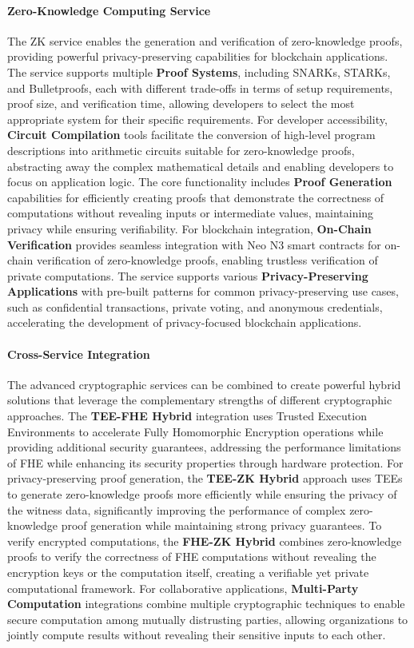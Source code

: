 \documentclass[11pt]{article}
\begin{document}
\paragraph{Zero-Knowledge Computing Service}
The ZK service enables the generation and verification of zero-knowledge proofs, providing powerful privacy-preserving capabilities for blockchain applications. The service supports multiple \textbf{Proof Systems}, including SNARKs, STARKs, and Bulletproofs, each with different trade-offs in terms of setup requirements, proof size, and verification time, allowing developers to select the most appropriate system for their specific requirements. For developer accessibility, \textbf{Circuit Compilation} tools facilitate the conversion of high-level program descriptions into arithmetic circuits suitable for zero-knowledge proofs, abstracting away the complex mathematical details and enabling developers to focus on application logic. The core functionality includes \textbf{Proof Generation} capabilities for efficiently creating proofs that demonstrate the correctness of computations without revealing inputs or intermediate values, maintaining privacy while ensuring verifiability. For blockchain integration, \textbf{On-Chain Verification} provides seamless integration with Neo N3 smart contracts for on-chain verification of zero-knowledge proofs, enabling trustless verification of private computations. The service supports various \textbf{Privacy-Preserving Applications} with pre-built patterns for common privacy-preserving use cases, such as confidential transactions, private voting, and anonymous credentials, accelerating the development of privacy-focused blockchain applications.

\paragraph{Cross-Service Integration}
The advanced cryptographic services can be combined to create powerful hybrid solutions that leverage the complementary strengths of different cryptographic approaches. The \textbf{TEE-FHE Hybrid} integration uses Trusted Execution Environments to accelerate Fully Homomorphic Encryption operations while providing additional security guarantees, addressing the performance limitations of FHE while enhancing its security properties through hardware protection. For privacy-preserving proof generation, the \textbf{TEE-ZK Hybrid} approach uses TEEs to generate zero-knowledge proofs more efficiently while ensuring the privacy of the witness data, significantly improving the performance of complex zero-knowledge proof generation while maintaining strong privacy guarantees. To verify encrypted computations, the \textbf{FHE-ZK Hybrid} combines zero-knowledge proofs to verify the correctness of FHE computations without revealing the encryption keys or the computation itself, creating a verifiable yet private computational framework. For collaborative applications, \textbf{Multi-Party Computation} integrations combine multiple cryptographic techniques to enable secure computation among mutually distrusting parties, allowing organizations to jointly compute results without revealing their sensitive inputs to each other.
\end{document}
